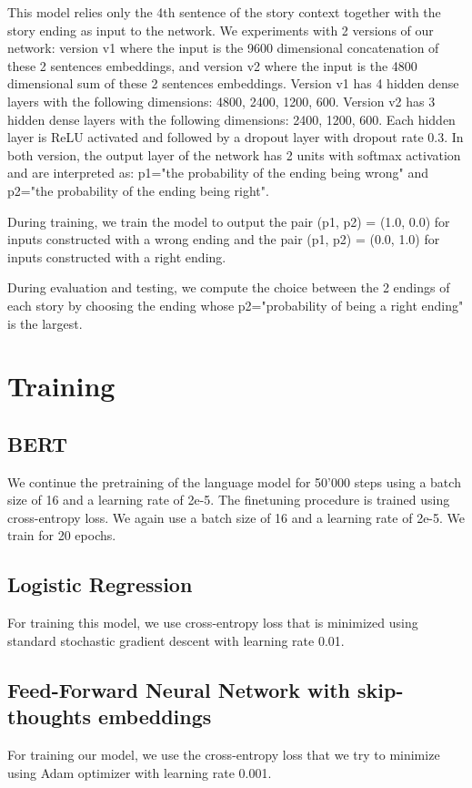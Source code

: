 \documentclass{article}
\begin{document}
This model relies only the 4th sentence of the story context together with the story ending as input to the network. We experiments with 2 versions of our network: version v1 where the input is the 9600 dimensional concatenation of these 2 sentences embeddings, and version v2 where the input is the 4800 dimensional sum of these 2 sentences embeddings. Version v1 has 4 hidden dense layers with the following dimensions: 4800, 2400, 1200, 600. Version v2 has 3 hidden dense layers with the following dimensions: 2400, 1200, 600. Each hidden layer is ReLU activated and followed by a dropout layer with dropout rate 0.3. In both version, the output layer of the network has 2 units with softmax activation and are interpreted as: p1="the probability of the ending being wrong" and p2="the probability of the ending being right".

During training, we train the model to output the pair (p1, p2) = (1.0, 0.0) for inputs constructed with a wrong ending and the pair (p1, p2) = (0.0, 1.0) for inputs constructed with a right ending.

During evaluation and testing, we compute the choice between the 2 endings of each story by choosing the ending whose p2="probability of being a right ending" is the largest.

\section{Training}
\subsection{BERT}
We continue the pretraining of the language model for 50'000 steps using a batch size of 16 and a learning rate of 2e-5. The finetuning procedure is trained using cross-entropy loss. We again use a batch size of 16 and a learning rate of 2e-5. We train for 20 epochs.
\subsection{Logistic Regression}
For training this model, we use cross-entropy loss that is minimized using standard stochastic gradient descent with learning rate 0.01.
\subsection{Feed-Forward Neural Network with skip-thoughts embeddings}
For training our model, we use the cross-entropy loss that we try to minimize using Adam optimizer with learning rate 0.001.
\end{document}
